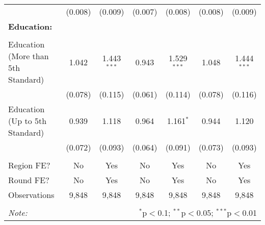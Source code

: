 \begin{tabular}{@{\extracolsep{5pt}}lcccccc}
  & (0.008) & (0.009) & (0.007) & (0.008) & (0.008) & (0.009) \\ 
  \textbf{Education:} &  &  &  &  &  &  \\ 
  &  &  &  &  &  &  \\ 
  Education (More than 5th Standard) & 1.042 & 1.443$^{***}$ & 0.943 & 1.529$^{***}$ & 1.048 & 1.444$^{***}$ \\ 
  & (0.078) & (0.115) & (0.061) & (0.114) & (0.078) & (0.116) \\ 
  Education (Up to 5th Standard) & 0.939 & 1.118 & 0.964 & 1.161$^{*}$ & 0.944 & 1.120 \\ 
  & (0.072) & (0.093) & (0.064) & (0.091) & (0.073) & (0.093) \\ 
  
 \hline \\[-1.8ex] 
Region FE? & No & Yes & No & Yes & No & Yes \\ 
Round FE? & No & Yes & No & Yes & No & Yes \\ 
Observations & 9,848 & 9,848 & 9,848 & 9,848 & 9,848 & 9,848 \\ 

\hline 
\hline \\[-1.8ex] 
\textit{Note:}  & \multicolumn{6}{r}{$^{*}$p$<$0.1; $^{**}$p$<$0.05; $^{***}$p$<$0.01} \\ 
\end{tabular} 
